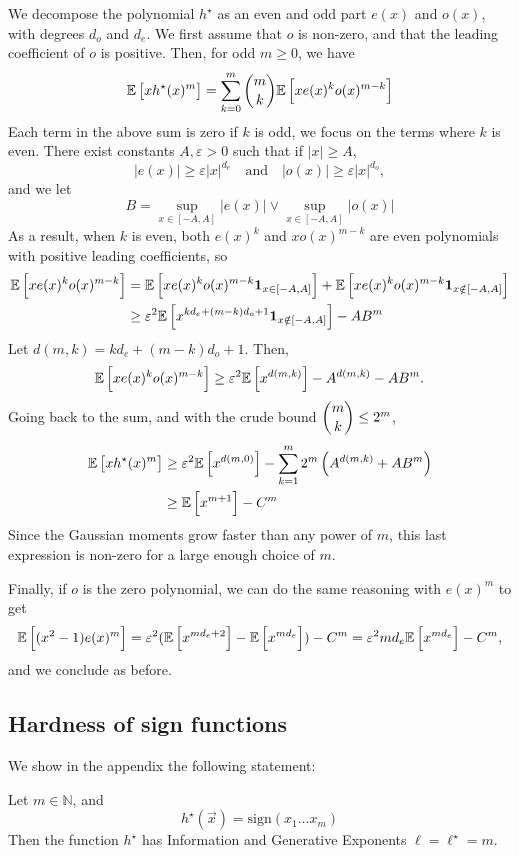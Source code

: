 We decompose the polynomial $h^\star$ as an even and odd part $e(x)$ and $o(x)$, with degrees $d_o$ and $d_e$. We first assume that $o$ is non-zero, and that the leading coefficient of $o$ is positive. Then, for odd $m \geq 0$, we have
\[ \mathbb{E}\left[xh^\star(x)^m\right] = \sum_{k = 0}^m \dbinom{m}{k} \mathbb{E}\left[x e(x)^k o(x)^{m-k}\right] \]
Each term in the above sum is zero if $k$ is odd, we focus on the terms where $k$ is even. There exist constants $A, \varepsilon > 0$ such that if $|x| \geq A$,
\[ |e(x)| \geq \varepsilon |x|^{d_e} \quad \text{and} \quad |o(x)| \geq \varepsilon |x|^{d_o}, \]
and we let
\[ B = \sup_{x \in  [-A, A]} |e(x)| \vee \sup_{x \in  [-A, A]} |o(x)| \]
As a result, when $k$ is even, both $e(x)^k$ and $xo(x)^{m-k}$ are even polynomials with positive leading coefficients, so
\begin{align*}
  \mathbb{E}\left[x e(x)^k o(x)^{m-k}\right] &= \mathbb{E}\left[x e(x)^k o(x)^{m-k} \mathbf{1}_{x\in [-A, A]}\right] + \mathbb{E}\left[x e(x)^k o(x)^{m-k} \mathbf{1}_{x\notin [-A, A]}\right] \\
  &\geq \varepsilon^2\mathbb{E}\left[ x^{kd_e + (m-k)d_o+1} \mathbf{1}_{x\notin [-A, A]}\right] - AB^m
\end{align*}
Let $d(m, k) = kd_e + (m-k)d_o+1$. Then,
\begin{align*}
  \mathbb{E}\left[x e(x)^k o(x)^{m-k}\right] \geq \varepsilon^2\mathbb{E}\left[x^{d(m, k)}\right] -  A^{d(m, k)} - AB^m.
\end{align*}
Going back to the sum, and with the crude bound $\dbinom{m}{k} \leq 2^m$,
\begin{align*}
  \mathbb{E}\left[xh^\star(x)^m\right] &\geq \varepsilon^2\mathbb{E}\left[x^{d(m, 0)}\right] - \sum_{k=1}^m 2^m\left(A^{d(m, k)} + AB^m\right) \\
  &\geq \mathbb{E}\left[x^{m+1}\right] - C^m
\end{align*}
Since the Gaussian moments grow faster than any power of $m$, this last expression is non-zero for a large enough choice of $m$.

Finally, if $o$ is the zero polynomial, we can do the same reasoning with $e(x)^m$ to get
\[ \mathbb{E}\left[(x^2-1) e(x)^m\right] = \varepsilon^2(\mathbb{E}\left[x^{m d_e+2}\right] - \mathbb{E}\left[x^{m d_e}\right]) - C^m = \varepsilon^2 md_e \mathbb{E}\left[x^{m d_e}\right] - C^m,\]
and we conclude as before.

\subsection{Hardness of sign functions}
We show in the appendix the following statement:
\begin{proposition}\label{2405:prop:app:sign_hard}
  Let $m \in \mathbb{N}$, and
  \[ h^\star(\vec{x}) = \mathrm{sign}(x_1\dots x_m) \]
  Then the function $h^\star$ has Information and Generative Exponents $\ell = \ell^\star = m$.
\end{proposition}

